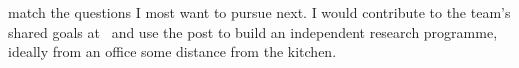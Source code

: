 
 match the questions I most want to pursue next. I would contribute to the team's shared goals at \theshortname\ and use the post to build an independent research programme, ideally from an office some distance from the kitchen.
